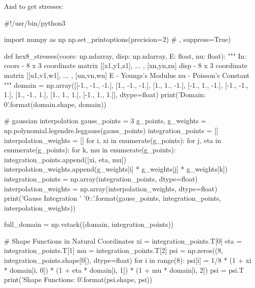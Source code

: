 \documentclass[10pt,b5paper,titlepage]{book}
\begin{document}
And to get stresses:
\begin{python}
#!/usr/bin/python3

import numpy as np
np.set_printoptions(precision=2) # , suppress=True)

def hex8_stresses(coors: np.ndarray,
                  disp: np.ndarray,
                  E: float,
                  nu: float):
    """
    In:
        coors - 8 x 3 coordinate matrix
                [[x1,y1,z1], ... , [xn,yn,zn]
        disp  - 8 x 3 coordinate matrix
                [[u1,v1,w1], ... , [un,vn,wn]
        E     - Youngs's Modulus
        nu    - Poisson's Constant
    """
    domain = np.array([[-1., -1., -1.],
                       [1., -1., -1.],
                       [1., 1., -1.],
                       [-1., 1., -1.],
                       [-1., -1., 1.],
                       [1., -1., 1.],
                       [1., 1., 1.],
                       [-1., 1., 1.]], dtype=float)
    print('Domain: {0}'.format(domain.shape, domain))

    # gaussian interpolation
    gauss_points = 3
    g_points, g_weights = np.polynomial.legendre.leggauss(gauss_points)
    integration_points = []
    interpolation_weights = []
    for i, xi in enumerate(g_points):
        for j, eta in enumerate(g_points):
            for k, mu in enumerate(g_points):
                integration_points.append([xi, eta, mu])
                interpolation_weights.append(g_weights[i] *
                                             g_weights[j] *
                                             g_weights[k])
    integration_points = np.array(integration_points, dtype=float)
    interpolation_weights = np.array(interpolation_weights, dtype=float)
    print('Gauss Integration '
          '{0}:\nWeights:'.format(gauss_points,
                                            integration_points,
                                            interpolation_weights))

    full_domain = np.vstack((domain, integration_points))

    # Shape Functions in Natural Coordinates
    xi = integration_points.T[0]
    eta = integration_points.T[1]
    mu = integration_points.T[2]
    psi = np.zeros((8, integration_points.shape[0]), dtype=float)
    for i in range(8):
        psi[i] = 1/8 * (1 + xi * domain[i, 0]) *
                       (1 + eta * domain[i, 1]) *
                       (1 + mu * domain[i, 2])
    psi = psi.T
    print('Shape Functions: {0}'.format(psi.shape, psi))


\end{python}
\end{document}
